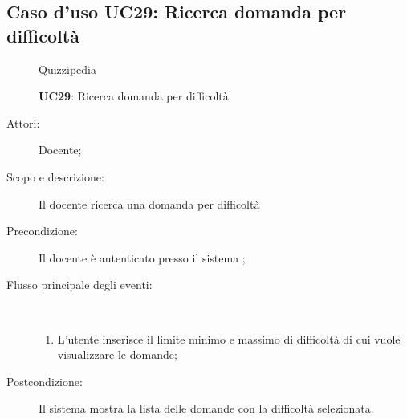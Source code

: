 \subsection{Caso d'uso UC29: Ricerca domanda per difficoltà}
	\begin{figure}[H]
		\centering
		\begin{resizedtikzpicture}{\textwidth}
		\begin{umlsystem}[x=0, fill=lightgray!20]{Quizzipedia}
		\end{umlsystem}
		\end{resizedtikzpicture}
		\caption{\textbf{UC29}: Ricerca domanda per difficoltà}
		\label{UC29}
	\end{figure}
\begin{description}
\item[Attori:] Docente;
\item[Scopo e descrizione:] Il docente ricerca una domanda per difficoltà

      \item[Precondizione:] Il docente è autenticato presso il sistema
;

        \item[Flusso principale degli eventi:] \ 
 \begin{enumerate}
          \item L'utente inserisce il limite minimo e massimo di difficoltà di cui vuole visualizzare le domande;

      \end{enumerate}
    \item[Postcondizione:] Il sistema mostra la lista delle domande con la difficoltà selezionata.
  \end{description}
\hypertarget{UC30}{}
